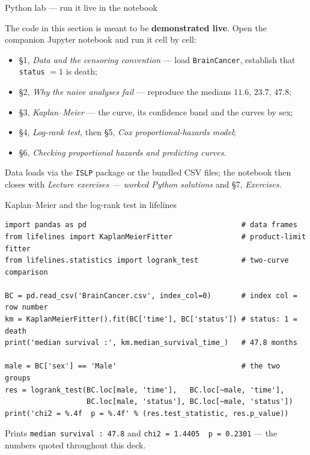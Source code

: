 \documentclass[aspectratio=169,11pt]{beamer}
\begin{document}
\begin{frame}{Python lab --- run it live in the notebook}
  \begin{labnote}
    The code in this section is meant to be \textbf{demonstrated live}. Open the companion
    Jupyter notebook and run it cell by cell:
    \begin{itemize}
      \item \S1, \emph{Data and the censoring convention} --- load \texttt{BrainCancer},
            establish that \texttt{status} $=1$ is death;
      \item \S2, \emph{Why the naive analyses fail} --- reproduce the medians
            $11.6$, $23.7$, $47.8$;
      \item \S3, \emph{Kaplan--Meier} --- the curve, its confidence band and the curves
            by sex;
      \item \S4, \emph{Log-rank test}, then \S5, \emph{Cox proportional-hazards model};
      \item \S6, \emph{Checking proportional hazards and predicting curves}.
    \end{itemize}
    Data loads via the \texttt{ISLP} package or the bundled CSV files; the notebook then
    closes with \emph{Lecture exercises --- worked Python solutions} and \S7,
    \emph{Exercises}.
  \end{labnote}
\end{frame}

\begin{frame}[fragile]{Kaplan--Meier and the log-rank test in lifelines}
  \begin{lstlisting}
import pandas as pd                                    # data frames
from lifelines import KaplanMeierFitter                # product-limit fitter
from lifelines.statistics import logrank_test          # two-curve comparison

BC = pd.read_csv('BrainCancer.csv', index_col=0)       # index col = row number
km = KaplanMeierFitter().fit(BC['time'], BC['status']) # status: 1 = death
print('median survival :', km.median_survival_time_)   # 47.8 months

male = BC['sex'] == 'Male'                             # the two groups
res = logrank_test(BC.loc[male, 'time'],   BC.loc[~male, 'time'],
                   BC.loc[male, 'status'], BC.loc[~male, 'status'])
print('chi2 = %.4f  p = %.4f' % (res.test_statistic, res.p_value))
  \end{lstlisting}
  \begin{takeaway}
    Prints \texttt{median survival : 47.8} and \texttt{chi2 = 1.4405\ \ p = 0.2301} ---
    the numbers quoted throughout this deck.
  \end{takeaway}
\end{frame}
\end{document}
